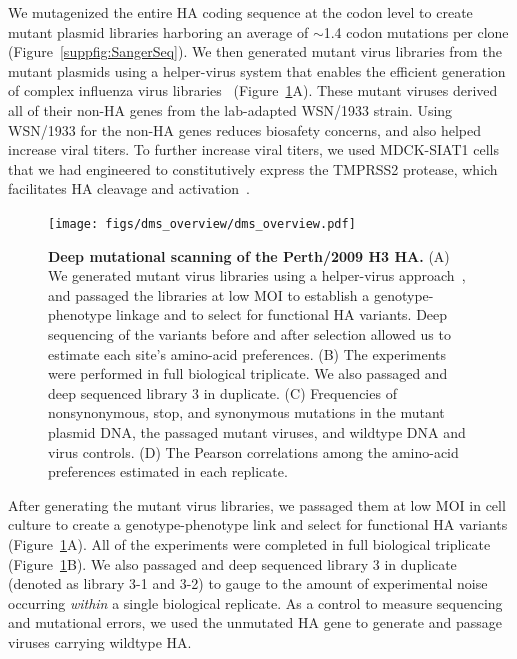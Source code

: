 \documentclass[9pt,twocolumn,twoside]{pnas-new}
\begin{document}
We mutagenized the entire HA coding sequence at the codon level to create mutant plasmid libraries harboring an average of $\sim$1.4 codon mutations per clone (Figure~\ref{suppfig:SangerSeq}).
We then generated mutant virus libraries from the mutant plasmids using a helper-virus system that enables the efficient generation of complex influenza virus libraries~\cite{doud2016accurate} (Figure~\ref{fig:dms_overview}A).
These mutant viruses derived all of their non-HA genes from the lab-adapted WSN/1933 strain.
Using WSN/1933 for the non-HA genes reduces biosafety concerns, and also helped increase viral titers.
To further increase viral titers, we used MDCK-SIAT1 cells that we had engineered to constitutively express the TMPRSS2 protease, which facilitates HA cleavage and activation~\cite{bottcher2006proteolytic, bottcher2010cleavage}.

\begin{figure}
\centering
\texttt{[image: figs/dms\_overview/dms\_overview.pdf]}
\caption{\label{fig:dms_overview}
{\bf Deep mutational scanning of the Perth/2009 H3 HA.}
(A) We generated mutant virus libraries using a helper-virus approach~\cite{doud2016accurate}, and passaged the libraries at low MOI to establish a genotype-phenotype linkage and to select for functional HA variants. 
Deep sequencing of the variants before and after selection allowed us to estimate each site's amino-acid preferences.
(B) The experiments were performed in full biological triplicate. 
We also passaged and deep sequenced library 3 in duplicate.
(C) Frequencies of nonsynonymous, stop, and synonymous mutations in the mutant plasmid DNA, the passaged mutant viruses, and wildtype DNA and virus controls. 
(D) The Pearson correlations among the amino-acid preferences estimated in each replicate. 
}
\end{figure}

After generating the mutant virus libraries, we passaged them at low MOI in cell culture to create a genotype-phenotype link and select for functional HA variants (Figure~\ref{fig:dms_overview}A).
All of the experiments were completed in full biological triplicate (Figure~\ref{fig:dms_overview}B). 
We also passaged and deep sequenced library 3 in duplicate (denoted as library 3-1 and 3-2) to gauge to the amount of experimental noise occurring \textit{within} a single biological replicate.
As a control to measure sequencing and mutational errors, we used the unmutated HA gene to generate and passage viruses carrying wildtype HA.
\end{document}
